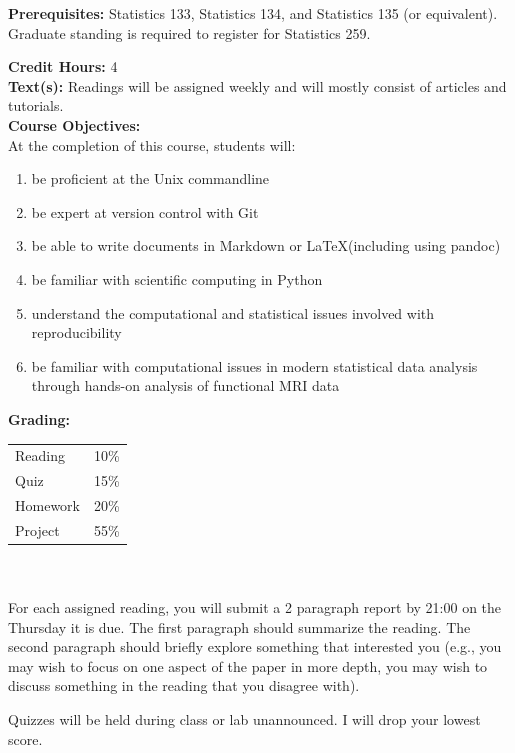 \documentclass[11pt]{article}
\begin{document}
\textbf {Prerequisites:} Statistics 133, Statistics 134, and Statistics 135
(or equivalent). Graduate standing is required to register for Statistics 259.

\textbf {Credit Hours:} 4 \\

\textbf {\large Text(s):} 
Readings will be assigned weekly and will mostly consist of articles and tutorials. \\

\textbf {\large Course Objectives:} \\
At the completion of this course, students will:
\begin{enumerate} \itemsep-0.4em
  \item be proficient at the Unix commandline
  \item be expert at version control with Git
  \item be able to write documents in Markdown or \LaTeX (including using
        pandoc)
  \item be familiar with scientific computing in Python
  \item understand the computational and statistical issues involved with
        reproducibility
  \item be familiar with computational issues in modern statistical data
        analysis through hands-on analysis of functional MRI data
\end{enumerate}

\textbf {\large Grading:} \\
\hspace*{40mm}
\begin{tabular}{ l l }
Reading  & 10\% \\
Quiz  & 15\% \\
Homework & 20\% \\
Project  & 55\%
\end{tabular} \\\\

For each assigned reading, you will submit a 2 paragraph report
by 21:00 on the Thursday it is due.
The first paragraph should summarize the reading.  The second paragraph
should briefly explore something that interested you (e.g., you
may wish to focus on one aspect of the paper in more depth, you
may wish to discuss something in the reading that you disagree
with).

Quizzes will be held during class or lab unannounced.  I will drop your
lowest score.
\end{document}
